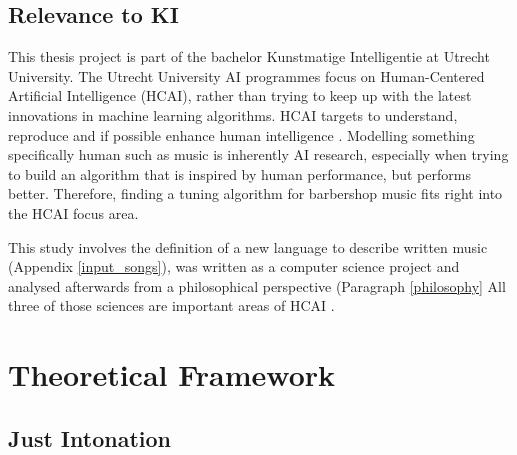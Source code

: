 \documentclass[a4paper]{article}
\begin{document}
\subsection{Relevance to KI}
This thesis project is part of the bachelor Kunstmatige Intelligentie at Utrecht University. The Utrecht University AI programmes focus on Human-Centered Artificial Intelligence (HCAI), rather than trying to keep up with the latest innovations in machine learning algorithms. HCAI targets to understand, reproduce and if possible enhance human intelligence \cite{utrecht_university_human-centered_2023}. Modelling something specifically human such as music is inherently AI research, especially when trying to build an algorithm that is inspired by human performance, but performs better. Therefore, finding a tuning algorithm for barbershop music fits right into the HCAI focus area.

This study involves the definition of a new language to describe written music (Appendix \ref{input_songs}), was written as a computer science project and analysed afterwards from a philosophical perspective (Paragraph \ref{philosophy} All three of those sciences are important areas of HCAI \cite{utrecht_university_human-centered_2023}.

\section{Theoretical Framework}
\subsection{Just Intonation}
\label{intro_ji}
\end{document}
